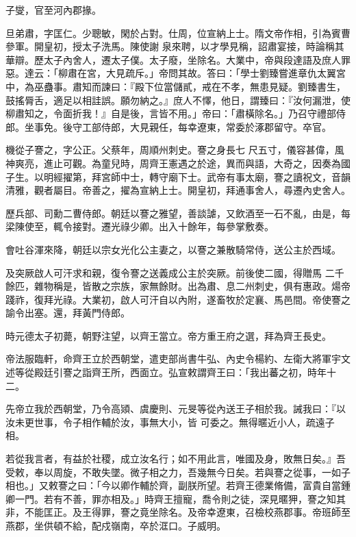 \begin{pinyinscope}
 子燮，官至河內郡掾。



 旦弟肅，字匡仁。少聰敏，閑於占對。仕周，位宣納上士。隋文帝作相，引為賓曹參軍。開皇初，授太子洗馬。陳使謝
 泉來聘，以才學見稱，詔肅宴接，時論稱其華辯。歷太子內舍人，遷太子僕。太子廢，坐除名。大業中，帝與段達語及庶人罪惡。達云：「柳肅在宮，大見疏斥。」帝問其故。答曰：「學士劉臻嘗進章仇太翼宮中，為巫蠱事。肅知而諫曰：『殿下位當儲貳，戒在不孝，無患見疑。劉臻書生，鼓搖脣舌，適足以相詿誤。願勿納之。』庶人不懌，他日，謂臻曰：『汝何漏泄，使柳肅知之，令面折我！』自是後，言皆不用。」帝曰：「肅橫除名。」乃召守禮部侍郎。坐事免。後守工部侍郎，大見親任，每幸遼東，常委於涿郡留守。卒官。



 機從子謇之，字公正。父蔡年，周順州刺史。謇之身長七
 尺五寸，儀容甚偉，風神爽亮，進止可觀。為童兒時，周齊王憲遇之於途，異而與語，大奇之，因奏為國子生。以明經擢第，拜宮師中士，轉守廟下士。武帝有事太廟，謇之讀祝文，音韻清雅，觀者屬目。帝善之，擢為宣納上士。開皇初，拜通事舍人，尋遷內史舍人。



 歷兵部、司勳二曹侍郎。朝廷以謇之雅望，善談謔，又飲酒至一石不亂，由是，每梁陳使至，輒令接對。遷光祿少卿。出入十餘年，每參掌敷奏。



 會吐谷渾來降，朝廷以宗女光化公主妻之，以謇之兼散騎常侍，送公主於西域。



 及突厥啟人可汗求和親，復令謇之送義成公主於突厥。前後使二國，得贈馬
 二千餘匹，雜物稱是，皆散之宗族，家無餘財。出為肅、息二州刺史，俱有惠政。煬帝踐祚，復拜光祿。大業初，啟人可汗自以內附，遂畜牧於定襄、馬邑間。帝使謇之諭令出塞。還，拜黃門侍郎。



 時元德太子初薨，朝野注望，以齊王當立。帝方重王府之選，拜為齊王長史。



 帝法服臨軒，命齊王立於西朝堂，遣吏部尚書牛弘、內史令楊約、左衛大將軍宇文述等從殿廷引謇之詣齊王所，西面立。弘宣敕謂齊王曰：「我出蕃之初，時年十二。



 先帝立我於西朝堂，乃令高熲、虞慶則、元旻等從內送王子相於我。誡我曰：『以汝未更世事，令子相作輔於汝，事無大小，皆
 可委之。無得暱近小人，疏遠子相。



 若從我言者，有益於社稷，成立汝名行；如不用此言，唯國及身，敗無日矣。』吾受敕，奉以周旋，不敢失墜。微子相之力，吾幾無今日矣。若與謇之從事，一如子相也。」又敕謇之曰：「今以卿作輔於齊，副朕所望。若齊王德業脩備，富貴自當鍾卿一門。若有不善，罪亦相及。」時齊王擅寵，喬令則之徒，深見暱狎，謇之知其非，不能匡正。及王得罪，謇之竟坐除名。及帝幸遼東，召檢校燕郡事。帝班師至燕郡，坐供頓不給，配戍嶺南，卒於洭口。子威明。




\end{pinyinscope}
